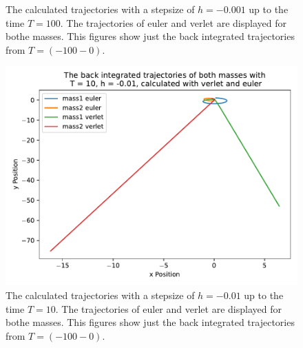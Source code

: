 \begin{itemize}
\begin{figure}
        \caption{The calculated trajectories with a stepsize of $h=-0.001$ up to the time $T=100$.
        The trajectories of euler and verlet are displayed for bothe masses.
        This figures show just the back integrated trajectories from $T=(-100 - 0)$.}
        \label{}
    \end{figure}
    \begin{figure}
        \centering
        \includegraphics[width=\textwidth]{plots/plotsT_10_h_001/plotd.pdf}
        \caption{The calculated trajectories with a stepsize of $h=-0.01$ up to the time $T=10$.
        The trajectories of euler and verlet are displayed for bothe masses.
        This figures show just the back integrated trajectories from $T=(-100 - 0)$.}
        \label{}
    \end{figure}


\end{itemize}





